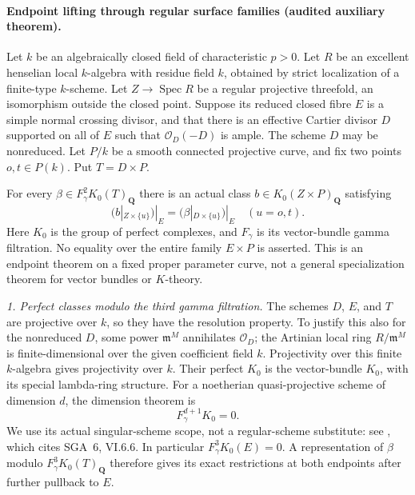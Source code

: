 \paragraph{Endpoint lifting through regular surface families
(audited auxiliary theorem).}
Let $k$ be an algebraically closed field of characteristic $p>0$.
Let $R$ be an excellent henselian local $k$-algebra with residue field
$k$, obtained by strict localization of a finite-type $k$-scheme.
Let $Z\to\operatorname{Spec}R$ be a regular projective threefold,
an isomorphism outside the closed point.  Suppose its reduced closed
fibre $E$ is a simple normal crossing divisor, and that there is an
effective Cartier divisor $D$ supported on all of $E$ such that
$\mathcal O_D(-D)$ is ample.  The scheme $D$ may be nonreduced.
Let $P/k$ be a smooth connected projective curve, and fix two points
$o,t\in P(k)$.  Put $T=D\times P$.

For every $\beta\in F_\gamma^2K_0(T)_{\mathbf Q}$ there is an actual
class $b\in K_0(Z\times P)_{\mathbf Q}$ satisfying
\begin{equation}
 (b|_{Z\times\{u\}})|_E
       =(\beta|_{D\times\{u\}})|_E\quad(u=o,t).
                                                        \tag{EL.1}
\end{equation}
Here $K_0$ is the group of perfect complexes, and $F_\gamma$ is its
vector-bundle gamma filtration.  No equality over the entire family
$E\times P$ is asserted.  This is an endpoint theorem on a fixed
proper parameter curve, not a general specialization theorem for
vector bundles or $K$-theory.

\emph{1. Perfect classes modulo the third gamma filtration.}
The schemes $D$, $E$, and $T$ are projective over $k$, so they have
the resolution property.  To justify this also for the nonreduced
$D$, some power $\mathfrak m^M$ annihilates $\mathcal O_D$; the
Artinian local ring $R/\mathfrak m^M$ is finite-dimensional over
the given coefficient field $k$.  Projectivity over this finite
$k$-algebra gives projectivity over $k$.
Their perfect $K_0$ is the vector-bundle
$K_0$, with its special lambda-ring structure.  For a noetherian
quasi-projective scheme of dimension $d$, the dimension theorem is
\begin{equation}
                         F_\gamma^{d+1}K_0=0.
                                                        \tag{EL.2}
\end{equation}
We use its actual singular-scheme scope, not a regular-scheme
substitute: see \citet[Chapter II, Remark 8.8.5, p.~83]
{D_Weibel2013KbookII}, which cites SGA~6, VI.6.6.
In particular $F_\gamma^3K_0(E)=0$.  A representation of $\beta$
modulo $F_\gamma^3K_0(T)_{\mathbf Q}$ therefore gives its exact
restrictions at both endpoints after further pullback to $E$.

